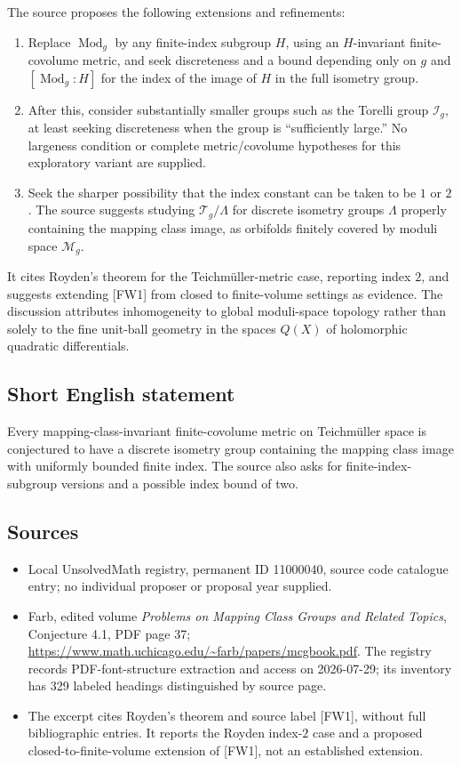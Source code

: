 \documentclass[11pt]{article}
\begin{document}
The source proposes the following extensions and refinements:
\begin{enumerate}
\item Replace $\operatorname{Mod}_g$ by any finite-index subgroup $H$, using an $H$-invariant finite-covolume metric, and seek discreteness and a bound depending only on $g$ and $[\operatorname{Mod}_g:H]$ for the index of the image of $H$ in the full isometry group.
\item After this, consider substantially smaller groups such as the Torelli group $\mathcal I_g$, at least seeking discreteness when the group is ``sufficiently large.'' No largeness condition or complete metric/covolume hypotheses for this exploratory variant are supplied.
\item Seek the sharper possibility that the index constant can be taken to be $1$ or $2$. The source suggests studying $\mathcal T_g/\Lambda$ for discrete isometry groups $\Lambda$ properly containing the mapping class image, as orbifolds finitely covered by moduli space $\mathcal M_g$.
\end{enumerate}
It cites Royden's theorem for the Teichm\"uller-metric case, reporting index $2$, and suggests extending [FW1] from closed to finite-volume settings as evidence. The discussion attributes inhomogeneity to global moduli-space topology rather than solely to the fine unit-ball geometry in the spaces $Q(X)$ of holomorphic quadratic differentials.
\subsection{Short English statement}
Every mapping-class-invariant finite-covolume metric on Teichm\"uller space is conjectured to have a discrete isometry group containing the mapping class image with uniformly bounded finite index. The source also asks for finite-index-subgroup versions and a possible index bound of two.
\subsection{Sources}
\begin{itemize}
\item Local UnsolvedMath registry, permanent ID 11000040, source code catalogue entry; no individual proposer or proposal year supplied.
\item Farb, edited volume \emph{Problems on Mapping Class Groups and Related Topics}, Conjecture 4.1, PDF page 37; \url{https://www.math.uchicago.edu/~farb/papers/mcgbook.pdf}. The registry records PDF-font-structure extraction and access on 2026-07-29; its inventory has 329 labeled headings distinguished by source page.
\item The excerpt cites Royden's theorem and source label [FW1], without full bibliographic entries. It reports the Royden index-$2$ case and a proposed closed-to-finite-volume extension of [FW1], not an established extension.
\end{itemize}
\end{document}
